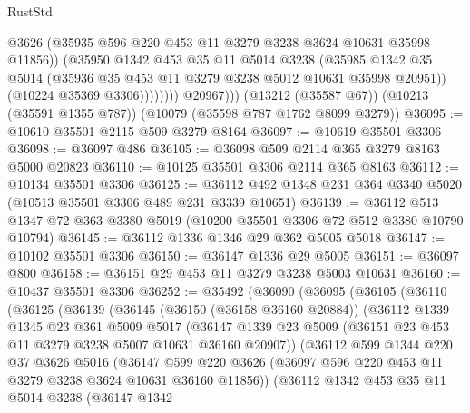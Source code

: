 \begin{lexlean}{RustStd}
\begin{coremodule}
{\begin{coremodule}
{{{{{{{{{{{{{{{{{{{{{{{{{{                        @3626
                        (@35935 @596 @220 @453 @11 @3279 @3238 @3624 @10631 @35998 @11856))
                      (@35950
                        @1342
                        @453
                        @35
                        @11
                        @5014
                        @3238
                        (@35985
                          @1342
                          @35
                          @5014
                          (@35936 @35 @453 @11 @3279 @3238 @5012 @10631 @35998 @20951))
                        (@10224 @35369 @3306))))))))
          @20967)))
    (@13212 (@35587 @67))
    (@10213 (@35591 @1355 @787))
    (@10079 (@35598 @787 @1762 @8099 @3279))
@36095 := @10610 @35501 @2115 @509 @3279 @8164
@36097 := @10619 @35501 @3306
@36098 := @36097 @486
@36105 := @36098 @509 @2114 @365 @3279 @8163 @5000 @20823
@36110 := @10125 @35501 @3306 @2114 @365 @8163
@36112 := @10134 @35501 @3306
@36125 := @36112 @492 @1348 @231 @364 @3340 @5020 (@10513 @35501 @3306 @489 @231 @3339 @10651)
@36139 := @36112 @513 @1347 @72 @363 @3380 @5019 (@10200 @35501 @3306 @72 @512 @3380 @10790 @10794)
@36145 := @36112 @1336 @1346 @29 @362 @5005 @5018
@36147 := @10102 @35501 @3306
@36150 := @36147 @1336 @29 @5005
@36151 := @36097 @800
@36158 := @36151 @29 @453 @11 @3279 @3238 @5003 @10631
@36160 := @10437 @35501 @3306
@36252 := @35492
    (@36090
      (@36095
        (@36105
          (@36110
            (@36125
              (@36139
                (@36145
                  (@36150 (@36158 @36160 @20884))
                  (@36112
                    @1339
                    @1345
                    @23
                    @361
                    @5009
                    @5017
                    (@36147
                      @1339
                      @23
                      @5009
                      (@36151 @23 @453 @11 @3279 @3238 @5007 @10631 @36160 @20907))
                    (@36112
                      @599
                      @1344
                      @220
                      @37
                      @3626
                      @5016
                      (@36147
                        @599
                        @220
                        @3626
                        (@36097 @596 @220 @453 @11 @3279 @3238 @3624 @10631 @36160 @11856))
                      (@36112
                        @1342
                        @453
                        @35
                        @11
                        @5014
                        @3238
                        (@36147
                          @1342
}}}}}}}}}}}}}}}}}}}}}}}}}}
\end{coremodule}}
\end{coremodule}
\end{lexlean}
